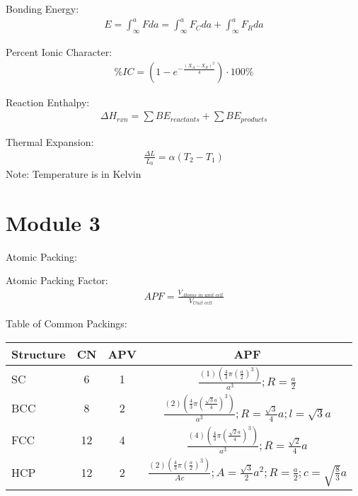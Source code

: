 \documentclass{article}
\begin{document}
\begin{multicols}{2}
Bonding Energy:
\begin{equation*}
    \begin{split}
        E = \int_\infty^a F \textit{da}  
          = \int_\infty^a F_C \textit{da} + \int_\infty^a F_R \textit{da}
    \end{split}
\end{equation*}

Percent Ionic Character:
\begin{equation*}
    \begin{split}
        \%IC = (1-e^{-\frac{(X_A-X_B)^2}{4}}) \cdot 100\%
    \end{split}
\end{equation*}

Reaction Enthalpy:
\begin{equation*}
    \begin{split}
        \Delta H_{\textit{rxn}} = \sum B E_{\textit{reactants}} + \sum B E_{\textit{products}}
    \end{split}
\end{equation*}

Thermal Expansion:
\begin{equation*}
    \begin{split}
        \frac{\Delta L}{L_0} = \alpha (T_2 - T_1)
    \end{split}
\end{equation*}
Note: Temperature is in Kelvin

\section{Module 3}

Atomic Packing:

Atomic Packing Factor:
\begin{equation*}
    \begin{split}
        \textit{APF} = \frac{V_\textit{Atoms in unit cell}}{V_\textit{Unit cell}} 
    \end{split}
\end{equation*}

Table of Common Packings:
\begin{center}
    \begin{tabular}{ l c c c }
        Structure  & CN & APV & APF\\
        \hline
        SC         & 6  & 1   & $\frac{(1)(\frac{4}{3} \pi (\frac{a}{2})^3)}{a^3}; R = \frac{a}{2}$\\ 
        BCC        & 8  & 2   & $\frac{(2)(\frac{4}{3} \pi (\frac{\sqrt{3}a}{4})^3)}{a^3}; R = \frac{\sqrt{3}}{4}a; l=\sqrt{3}a$\\  
        FCC        & 12 & 4   & $\frac{(4)(\frac{4}{3} \pi (\frac{\sqrt{2}a}{4})^3)}{a^3}; R = \frac{\sqrt{2}}{4}a$\\  
        HCP        & 12 & 2   & $\frac{(2)(\frac{4}{3} \pi (\frac{a}{2})^3)}{A c}; A = \frac{\sqrt{3}}{2}a^2; R = \frac{a}{2}; c = \sqrt{\frac{8}{3}}a$\\  
    \end{tabular}
\end{center}


\end{multicols}
\end{document}
